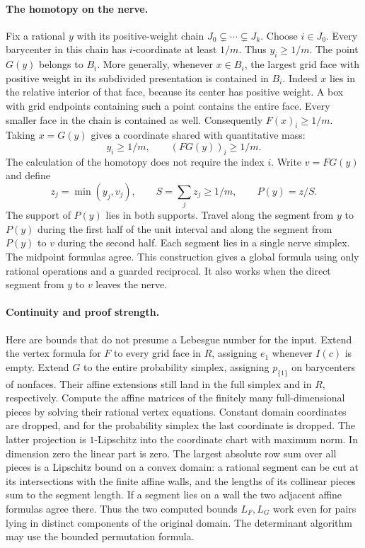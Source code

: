 \paragraph{The homotopy on the nerve.}
Fix a rational $y$ with its positive-weight chain
$J_0\subsetneq\cdots\subsetneq J_k$. Choose $i\in J_0$. Every barycenter
in this chain has $i$-coordinate at least $1/m$. Thus $y_i\geq1/m$.
The point $G(y)$ belongs to $B_i$. More generally, whenever $x\in B_i$,
the largest grid face with positive weight in its subdivided presentation
is contained in $B_i$. Indeed $x$ lies in the relative interior of that
face, because its center has positive weight. A box with grid endpoints
containing such a point contains the entire face. Every smaller face
in the chain is contained as well. Consequently $F(x)_i\geq1/m$.
Taking $x=G(y)$ gives a coordinate shared with quantitative mass:
\[
  y_i\geq1/m,\qquad (FG(y))_i\geq1/m.
\]
The calculation of the homotopy does not require the index $i$.
Write $v=FG(y)$ and define
\[
   z_j=\min(y_j,v_j),\qquad S=\sum_j z_j\geq1/m,\qquad P(y)=z/S.
\]
The support of $P(y)$ lies in both supports. Travel along the segment
from $y$ to $P(y)$ during the first half of the unit interval and along
the segment from $P(y)$ to $v$ during the second half. Each segment lies
in a single nerve simplex. The midpoint formulas agree. This construction
gives a global formula using only rational operations and a guarded
reciprocal. It also works when the direct segment from $y$ to $v$ leaves
the nerve.

\paragraph{Continuity and proof strength.}
Here are bounds that do not presume a Lebesgue number for the input.
Extend the vertex formula for $F$ to every grid face in $R$, assigning
$e_1$ whenever $I(c)$ is empty. Extend $G$ to the entire probability
simplex, assigning $p_{\{1\}}$ on barycenters of nonfaces. Their affine
extensions still land in the full simplex and in $R$, respectively.
Compute the affine matrices of the finitely many full-dimensional pieces
by solving their rational vertex equations. Constant domain coordinates
are dropped, and for the probability simplex the last coordinate is
dropped. The latter projection is $1$-Lipschitz into the coordinate
chart with maximum norm. In dimension zero the linear part is zero.
The largest absolute row sum over all pieces is a Lipschitz bound on a
convex domain: a rational segment can be cut at its intersections with
the finite affine walls, and the lengths of its collinear pieces sum to
the segment length. If a segment lies on a wall the two adjacent affine
formulas agree there. Thus the two computed bounds $L_F,L_G$ work even
for pairs lying in distinct components of the original domain.
The determinant algorithm may use the bounded permutation formula.

